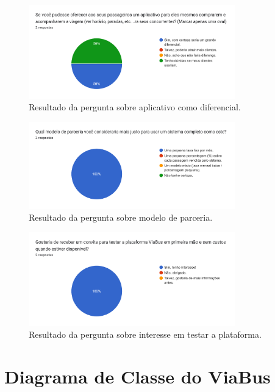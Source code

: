 \begin{apendicesenv}
  \begin{figure}[htbp]
    \centering
    \includegraphics[width=0.8\textwidth]{imagens/imagem9.png}
    \caption{Resultado da pergunta sobre aplicativo como diferencial.}
    \label{fig:aplicativo-como-diferencial}
  \end{figure}

  \begin{figure}[htbp]
    \centering
    \includegraphics[width=0.8\textwidth]{imagens/imagem10.png}
    \caption{Resultado da pergunta sobre modelo de parceria.}
    \label{fig:modelo-de-parceria}
  \end{figure}

  \begin{figure}[htbp]
    \centering
    \includegraphics[width=0.8\textwidth]{imagens/imagem11.png}
    \caption{Resultado da pergunta sobre interesse em testar a plataforma.}
    \label{fig:interesse-em-testar-a-plataforma}
  \end{figure}

  \chapter{Diagrama de Classe do ViaBus}
  \label{apendice:diagrama-classe}


\end{apendicesenv}
